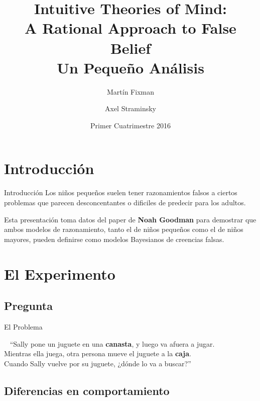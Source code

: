 \documentclass{beamer}
\title{Intuitive Theories of Mind: \\ A Rational Approach to False Belief \\ \vspace{1ex} {\large Un Pequeño Análisis}}
\author[Grupo 9]{%
	Martín Fixman \and
	Axel Straminsky
}
\date{Primer Cuatrimestre 2016}
\begin{document}
\begin{frame}[fragile]
\titlepage{}
\end{frame}

\section{Introducción}

\begin{frame}[fragile]{Introducción}
Los niños pequeños suelen tener razonamientos falsos a ciertos problemas que parecen desconcentantes o dificiles de predecir para los adultos.

Esta presentación toma datos del paper de \textbf{Noah Goodman}\cite{goodman00} para demostrar que ambos modelos de razonamiento, tanto el de niños pequeños como el de niños mayores, pueden definirse como modelos Bayesianos de creencias falsas.
\end{frame}

\section{El Experimento}

\subsection{Pregunta}

\begin{frame}[fragile]{El Problema}
\begin{block}{\ \vspace{1em}}
``Sally pone un juguete en una \textbf{canasta}, y luego va afuera a jugar. \\
Mientras ella juega, otra persona mueve el juguete a la \textbf{caja}. \\
Cuando Sally vuelve por su juguete, ¿dónde lo va a buscar?''
\end{block}

\vspace{1em}

\end{frame}

\subsection{Diferencias en comportamiento}
\end{document}
